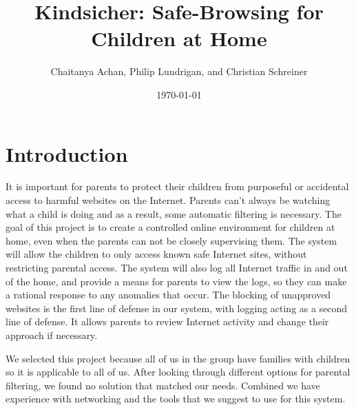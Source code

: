 \documentclass[12pt] {article}
\begin{document}
\title{Kindsicher: Safe-Browsing for Children at Home}
\author{Chaitanya Achan, Philip Lundrigan, and Christian Schreiner}
\date \today
\maketitle
\setcounter{page}{1}

%
%
%
%
%
%
%

\section*{Introduction}
It is important for parents to protect their children from purposeful or
accidental access to harmful websites on the Internet. Parents can't always be
watching what a child is doing and as a result, some automatic filtering is
necessary. The goal of this project is to create a controlled online
environment for children at home, even when the parents can not be closely
supervising them. The system will allow the children to only access known safe
Internet sites, without restricting parental access. The system will also log
all Internet traffic in and out of the home, and provide a means for parents to
view the logs, so they can make a rational response to any anomalies that
occur. The blocking of unapproved websites is the first line of defense in our
system, with logging acting as a second line of defense. It allows parents to
review Internet activity and change their approach if necessary.

We selected this project because all of us in the group have families with
children so it is applicable to all of us. After looking through different
options for parental filtering, we found no solution that matched our needs.
Combined we have experience with networking and the tools that we suggest to
use for this system.
\end{document}
